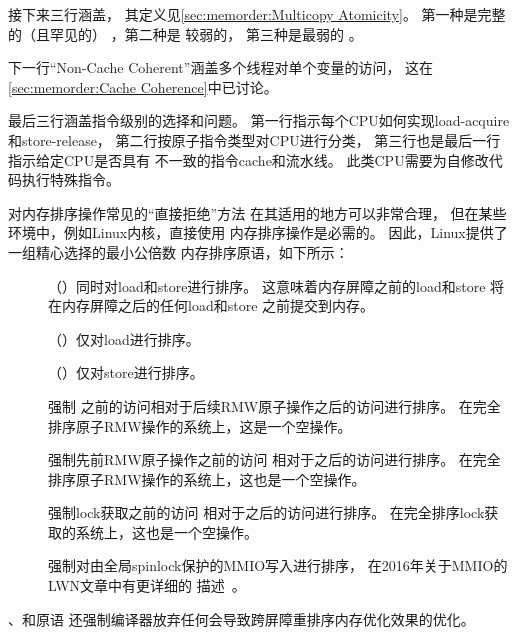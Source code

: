 接下来三行涵盖，
其定义见\cref{sec:memorder:Multicopy Atomicity}。
第一种是完整的（且罕见的）
，第二种是
较弱的，
第三种是最弱的
。

下一行``Non-Cache Coherent''涵盖多个线程对单个变量的访问，
这在\cref{sec:memorder:Cache Coherence}中已讨论。

最后三行涵盖指令级别的选择和问题。
第一行指示每个CPU如何实现load-acquire和store-release，
第二行按原子指令类型对CPU进行分类，
第三行也是最后一行指示给定CPU是否具有
不一致的指令cache和流水线。
此类CPU需要为自修改代码执行特殊指令。


对内存排序操作常见的``直接拒绝''方法
在其适用的地方可以非常合理，
但在某些环境中，例如Linux内核，直接使用
内存排序操作是必需的。
因此，Linux提供了一组精心选择的最小公倍数
内存排序原语，如下所示：
\begin{description}
\item	[] （）同时对load和store进行排序。
	这意味着内存屏障之前的load和store
	将在内存屏障之后的任何load和store
	之前提交到内存。
\item	[] （）仅对load进行排序。
\item	[] （）仅对store进行排序。
\item	[] 强制
	之前的访问相对于后续RMW原子操作之后的访问进行排序。
	在完全排序原子RMW操作的系统上，这是一个空操作。
\item	[] 强制先前RMW原子操作之前的访问
	相对于之后的访问进行排序。
	在完全排序原子RMW操作的系统上，这也是一个空操作。
\item	[] 强制lock获取之前的访问
	相对于之后的访问进行排序。
	在完全排序lock获取的系统上，这也是一个空操作。
\item	[] 强制对由全局spinlock保护的MMIO写入进行排序，
	在2016年关于MMIO的LWN文章中有更详细的
	描述~\cite{PaulEMcKenney2016LinuxKernelMMIO}。
\end{description}
、和原语
还强制编译器放弃任何会导致跨屏障重排序内存优化效果的优化。

